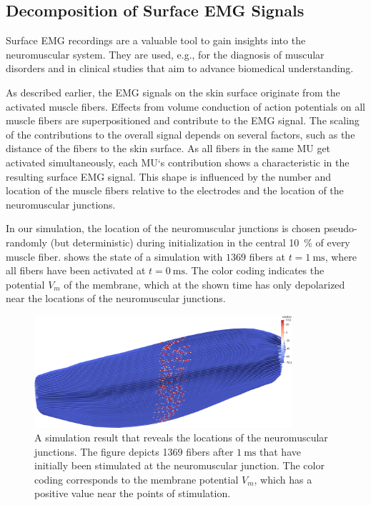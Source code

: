 \subsection{Decomposition of Surface EMG Signals}\label{sec:simfiber_decomposition}

Surface EMG recordings are a valuable tool to gain insights into the neuromuscular system. They are used, e.g., for the diagnosis of muscular disorders and in clinical studies that aim to advance biomedical understanding.

As described earlier, the EMG signals on the skin surface originate from the activated muscle fibers. Effects from volume conduction of action potentials on all muscle fibers are superpositioned and contribute to the EMG signal. The scaling of the contributions to the overall signal depends on several factors, such as the distance of the fibers to the skin surface. As all fibers in the same MU get activated simultaneously, each MU`s contribution shows a characteristic  in the resulting surface EMG signal. This shape is influenced by the number and location of the muscle fibers relative to the electrodes and the location of the neuromuscular junctions.

In our simulation, the location of the neuromuscular junctions is chosen pseudo-randomly (but deterministic) during initialization in the central \SI{10}{\percent} of every muscle fiber.  shows the state of a simulation with $1369$ fibers at $t=\SI{1}{\ms}$, where all fibers have been activated at $t=\SI{0}{\ms}$. The color coding indicates the potential $V_m$ of the membrane, which at the shown time has only depolarized near the locations of the neuromuscular junctions.

\begin{figure}
  \centering%
  \includegraphics[width=0.85\textwidth]{images/results/application/emg_video_37_junctions.png}%
  \caption{A simulation result that reveals the locations of the neuromuscular junctions. The figure depicts 1369 fibers after $\SI{1}{\ms}$ that have initially been stimulated at the neuromuscular junction. The color coding corresponds to the membrane potential $V_m$, which has a positive value near the points of stimulation.}%
  \label{fig:emg_video_37_junctions}%
\end{figure}

